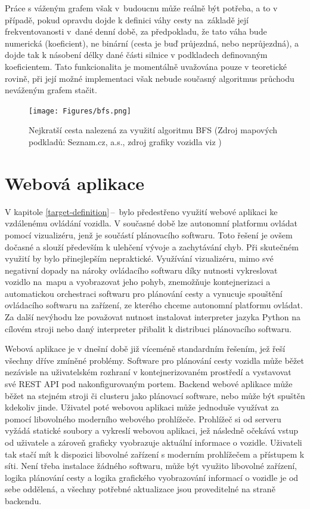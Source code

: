 \documentclass[czech, bachelor]{diploma}
\newcommand{\peteref}[1]{\ref{#1}\,--\,\nameref{#1}}
\begin{document}
Práce s váženým grafem však v~budoucnu může reálně být potřeba, a to v případě, pokud opravdu dojde k definici váhy cesty
na~základě její frekventovanosti v~dané denní době, za předpokladu, že tato váha bude numerická (koeficient), ne binární
(cesta je buď průjezdná, nebo neprůjezdná), a dojde tak k násobení délky dané části silnice v podkladech definovaným koeficientem.
Tato funkcionalita je momentálně uvažována pouze v teoretické rovině, při její možné implementaci však nebude současný algoritmus
průchodu neváženým grafem stačit.

\begin{figure}
    \centering
    \texttt{[image: Figures/bfs.png]}
    \caption{Nejkratší cesta nalezená za využití algoritmu BFS (Zdroj mapových podkladů: Seznam.cz, a.s., zdroj grafiky
    vozidla viz \cite{car-sprite-source})}
    \label{fig:bfs}
\end{figure}

\chapter{Webová aplikace} \label{web-app}

V kapitole \peteref{target-definition} bylo předestřeno využití webové aplikaci ke vzdálenému ovládání vozidla. V současné době
lze autonomní platformu ovládat pomocí vizualizéru, jenž je součástí plánovacího softwaru. Toto řešení je ovšem dočasné a slouží
především k ulehčení vývoje a zachytávání chyb. Při skutečném využití by bylo přinejlepším nepraktické. Využívání vizualizéru,
mimo své negativní dopady na nároky ovládacího softwaru díky nutnosti vykreslovat vozidlo na~mapu a vyobrazovat jeho pohyb,
znemožňuje kontejnerizaci a automatickou orchestraci\cite{virtualization-source} softwaru pro plánování cesty a vynucuje spouštění
ovládacího softwaru na zařízení, ze kterého chceme autonomní platformu ovládat. Za další nevýhodu lze považovat nutnost instalovat
interpreter jazyka Python na cílovém stroji nebo daný interpreter přibalit k distribuci plánovacího softwaru.

Webová aplikace je v dnešní době již víceméně standardním řešením, jež řeší všechny dříve zmíněné problémy. Software pro plánování
cesty vozidla může běžet nezávisle na uživatelském rozhraní v kontejnerizovaném prostředí a vystavovat své REST API
pod nakonfigurovaným portem. Backend webové aplikace může běžet na stejném stroji či clusteru jako plánovací software, nebo může
být spuštěn kdekoliv jinde. Uživatel poté webovou aplikaci může jednoduše využívat za pomocí libovolného moderního webového
prohlížeče. Prohlížeč si od serveru vyžádá statické soubory a vykreslí webovou aplikaci, jež následně očekává vstup od uživatele
a zároveň graficky vyobrazuje aktuální informace o vozidle. Uživateli tak stačí mít k dispozici libovolné zařízení s moderním
prohlížečem a přístupem k síti. Není třeba instalace žádného softwaru, může být využito libovolné zařízení, logika plánování cesty
a logika grafického vyobrazování informací o vozidle je od sebe oddělená, a všechny potřebné aktualizace jsou proveditelné
na straně backendu.
\end{document}
